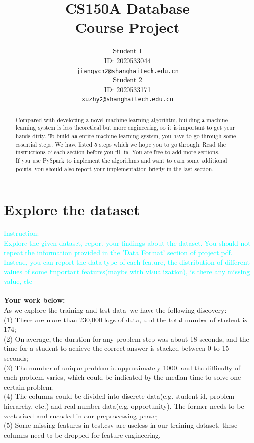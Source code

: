 \documentclass{article}
\title{CS150A Database \\Course Project}
\author{
  Student 1\\
  ID: 2020533044\\
  \texttt{jiangych2@shanghaitech.edu.cn} \\
   \And
  Student 2\\
  ID: 2020533171\\
  \texttt{xuzhy2@shanghaitech.edu.cn}
}
\begin{document}

\maketitle

\begin{abstract}

Compared with developing a novel machine learning algorihtm, building a machine learning system is less theoretical but more engineering, so it is important to get your hands dirty. To build an entire machine learning system, you have to go through some essential steps. We have listed 5 steps which we hope you to go through. Read the instructions of each section before you fill in. You are free to add more sections. \\
If you use PySpark to implement the algorithms and want to earn some additional points, you should also report your implementation briefly in the last section.
\end{abstract}

\section{Explore the dataset}
\textcolor{cyan}{Instruction: \\
Explore the given dataset, report your findings about the dataset. You should not repeat the information provided in the 'Data Format' section of project.pdf. Instead, you can report the data type of each feature, the distribution of different values of some important features(maybe with visualization), is there any missing value, etc}\\\\
\textbf{Your work below:}\\
As we explore the training and test data, we have the following discovery:\\
(1) There are more than 230,000 logs of data, and the total number of student is 174;\\
(2) On average, the duration for any problem step was about 18 seconds, and the time for a student to achieve the correct answer is stacked between 0 to 15 seconds;\\
(3) The number of unique problem is approximately 1000, and the difficulty of each problem varies, which could be indicated by the median time to solve one certain problem;\\
(4) The columns could be divided into discrete data(e.g. student id, problem hierarchy, etc.) and real-number data(e.g. opportunity). The former needs to be vectorized and encoded in our preprocessing phase;\\
(5) Some missing features in test.csv are useless in our training dataset, these columns need to be dropped for feature engineering.
\end{document}
